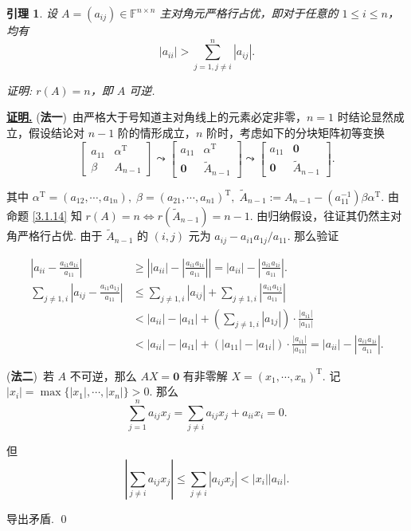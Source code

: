 \documentclass[10pt,openany]{article}
\theoremstyle{thmstyle} %
\theoremstyle{defstyle} %
\newtheorem{lemma}[theorem]{引理}
\theoremstyle{prostyle} %
\theoremstyle{exastyle}
\theoremstyle{remstyle}
\renewenvironment{proof}[1][证明]{\par\underline{\textbf{#1.}} \;\fangsong}{\qed\par}
\newcommand{\T}{^{\text{T}}}
\newcommand{\F}{\mathbb{F}}
\newcommand{\n}{^{n \times n}}
\begin{document}
\begin{lemma} \label{3.1.26}
	设 \( A = (a_{ij}) \in \F\n \) 主对角元严格行占优，即对于任意的 \( 1 \leq i \leq n \)，均有
	\[
	|a_{ii}| > \sum_{j=1, j \neq i}^{n} |a_{ij}|.
	\]
	
	证明: \( r(A)=n \)，即 \( A \) 可逆.
\end{lemma}

\begin{proof}
	(\textbf{法一})\ 由严格大于号知道主对角线上的元素必定非零，\( n=1 \) 时结论显然成立，假设结论对 \( n-1 \) 阶的情形成立，\( n \) 阶时，考虑如下的分块矩阵初等变换
	\[ \begin{bmatrix}
		a_{11} & \alpha\T \\ \beta & A_{n-1}
	\end{bmatrix} \leadsto \begin{bmatrix}
		a_{11} & \alpha\T \\ \bm{0} & \widetilde{A}_{n-1}
	\end{bmatrix} \leadsto \begin{bmatrix}
	a_{11} & \bm{0} \\ \bm{0} & \widetilde{A}_{n-1}
	\end{bmatrix}. \]
	
	其中 \( \alpha\T=(a_{12},\cdots,a_{1n}), \; \beta=(a_{21},\cdots,a_{n1})\T, \; \widetilde{A}_{n-1}:=A_{n-1}-(a_{11}^{-1})\beta\alpha\T \). 由命题 \ref{3.1.14} 知 \( r(A)=n \Leftrightarrow r(\widetilde{A}_{n-1})=n-1\). 由归纳假设，往证其仍然主对角严格行占优. 由于 \( \widetilde{A}_{n-1} \) 的 \( (i,j) \) 元为 \( a_{ij}-a_{i1}a_{1j}/a_{11} \). 那么验证
	
	\begin{align*}
		\left| a_{ii}-\frac{a_{i1}a_{1i}}{a_{11}} \right| & \geq \left| |a_{ii}|- \left| \frac{a_{i1}a_{1i}}{a_{11}} \right|\right|= |a_{ii}|- \left| \frac{a_{i1}a_{1i}}{a_{11}} \right|. \\[2ex]
		\sum_{j \neq 1,i}^{} \left| a_{ij}-\frac{a_{i1}a_{1j}}{a_{11}} \right| & \leq \sum_{j \neq 1,i}^{} \left| a_{ij}\right|+ \sum_{j \neq 1,i}^{} \left| \frac{a_{i1}a_{1j}}{a_{11}} \right| \\
		&< |a_{ii}|-|a_{i1}|+ \left( \sum_{j \neq 1,i}^{} |a_{1j}| \right) \cdot \frac{|a_{i1}|}{|a_{11}|} \\
		&< |a_{ii}|-|a_{i1}|+ (|a_{11}|-|a_{1i}|)\cdot \frac{|a_{i1}|}{|a_{11}|}= |a_{ii}|- \left| \frac{a_{i1}a_{1i}}{a_{11}} \right|.
	\end{align*}
	
	(\textbf{法二})\ 若 \( A \) 不可逆，那么 \( AX=\bm{0} \) 有非零解 \( X=(x_1,\cdots,x_n)\T \). 记 \( |x_i|=\max\{ |x_1|,\cdots,|x_n|\}>0 \). 那么
	\[ \sum_{j=1}^{n} a_{ij}x_j= \sum_{j \neq i}^{} a_{ij}x_j+ a_{ii}x_i=0. \]
	
	但
	\[ \left| \sum_{j \neq i}^{} a_{ij}x_j \right| \leq \sum_{j \neq i}^{} |a_{ij}x_j| < |x_i||a_{ii}|. \]
	
	导出矛盾.
\end{proof}
\end{document}
